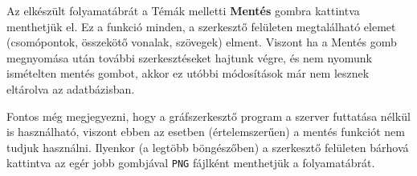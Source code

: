 Az elkészült folyamatábrát a Témák melletti \textbf{Mentés} gombra kattintva menthetjük el. Ez a funkció minden, a szerkesztő felületen megtalálható elemet (csomópontok, összekötő vonalak, szövegek) elment. Viszont ha a Mentés gomb megnyomása után további szerkesztéseket hajtunk végre, és nem nyomunk ismételten mentés gombot, akkor ez utóbbi módosítások már nem lesznek eltárolva az adatbázisban.

Fontos még megjegyezni, hogy a gráfszerkesztő program a szerver futtatása nélkül is használható, viszont ebben az esetben (értelemszerűen) a mentés funkciót nem tudjuk használni. Ilyenkor (a legtöbb böngészőben) a szerkesztő felületen bárhová kattintva az egér jobb gombjával \texttt{PNG} fájlként menthetjük a folyamatábrát.